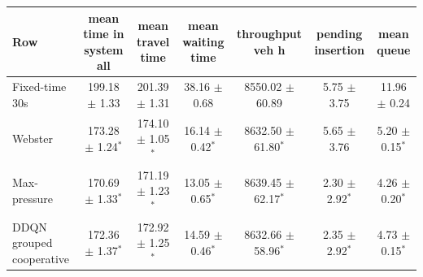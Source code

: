 \begin{tabular}{lcccccc}
\toprule
Row & mean time in system all & mean travel time & mean waiting time & throughput veh h & pending insertion & mean queue \\
\midrule
Fixed-time 30s & 199.18 $\pm$ 1.33 & 201.39 $\pm$ 1.31 & 38.16 $\pm$ 0.68 & 8550.02 $\pm$ 60.89 & 5.75 $\pm$ 3.75 & 11.96 $\pm$ 0.24 \\
Webster & 173.28 $\pm$ 1.24$^{*}$ & 174.10 $\pm$ 1.05$^{*}$ & 16.14 $\pm$ 0.42$^{*}$ & 8632.50 $\pm$ 61.80$^{*}$ & 5.65 $\pm$ 3.76 & 5.20 $\pm$ 0.15$^{*}$ \\
Max-pressure & 170.69 $\pm$ 1.33$^{*}$ & 171.19 $\pm$ 1.23$^{*}$ & 13.05 $\pm$ 0.65$^{*}$ & 8639.45 $\pm$ 62.17$^{*}$ & 2.30 $\pm$ 2.92$^{*}$ & 4.26 $\pm$ 0.20$^{*}$ \\
DDQN grouped cooperative & 172.36 $\pm$ 1.37$^{*}$ & 172.92 $\pm$ 1.25$^{*}$ & 14.59 $\pm$ 0.46$^{*}$ & 8632.66 $\pm$ 58.96$^{*}$ & 2.35 $\pm$ 2.92$^{*}$ & 4.73 $\pm$ 0.15$^{*}$ \\
\bottomrule
\end{tabular}
